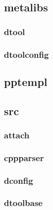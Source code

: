 \documentclass[a4paper]{article}
\begin{document}
\clearpage\subsection[metalibs]{metalibs}
\hypertarget{RefHeading19791167907073}{}\clearpage\subsubsection[dtool]{dtool}
\hypertarget{RefHeading19811167907073}{}\clearpage\subsubsection[dtoolconfig]{dtoolconfig}
\hypertarget{RefHeading19831167907073}{}\clearpage\subsection[pptempl]{pptempl}
\hypertarget{RefHeading19851167907073}{}\clearpage\subsection[src]{src}
\hypertarget{RefHeading19871167907073}{}\clearpage\subsubsection[attach]{attach}
\hypertarget{RefHeading19891167907073}{}\subsubsection{}
\clearpage\subsubsection[cppparser]{cppparser}
\hypertarget{RefHeading19911167907073}{}\subsubsection{}
\clearpage\subsubsection[dconfig]{dconfig}
\hypertarget{RefHeading19931167907073}{}\subsubsection{}
\clearpage\subsubsection[dtoolbase]{dtoolbase}
\end{document}
